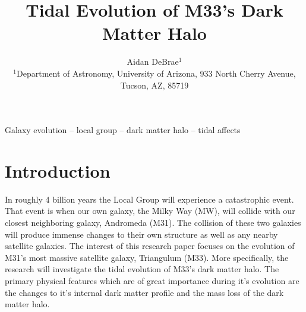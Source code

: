 \documentclass[fleqn,usenatbib]{mnras}
\title{Tidal Evolution of M33’s Dark Matter Halo}
\author{
Aidan DeBrae$^{1}$
\\
$^{1}$Department of Astronomy, University of Arizona, 933 North Cherry Avenue, Tucson, AZ, 85719}
\begin{document}
\label{firstpage}
\pagerange{\pageref{firstpage}--\pageref{lastpage}}
\maketitle

\begin{keywords}
Galaxy evolution -- local group -- dark matter halo -- tidal affects
\end{keywords}



\section{Introduction}

In roughly 4 billion years the Local Group will experience a catastrophic event. That event is when our own galaxy, the Milky Way (MW), will collide with our closest neighboring galaxy, Andromeda (M31). The collision of these two galaxies will produce immense changes to their own structure as well as any nearby satellite galaxies. The interest of this research paper focuses on the evolution of M31's most massive satellite galaxy, Triangulum (M33). More specifically, the research will investigate the tidal evolution of M33's dark matter halo. The primary physical features which are of great importance during it's evolution are the changes to it's internal dark matter profile and the mass loss of the dark matter halo. 
\end{document}
